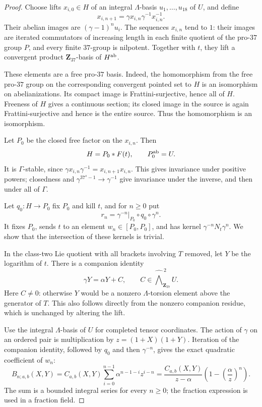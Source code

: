 \begin{proof}
Choose lifts \(x_{i,0}\in H\) of an integral \(\Lambda\)-basis
\(u_1,\ldots,u_{18}\) of \(U\), and define
\[
 x_{i,n+1}=\gamma x_{i,n}\gamma^{-1}x_{i,n}^{-1}.
\]
Their abelian images are \((\gamma-1)^nu_i\).
The sequences \(x_{i,n}\) tend to \(1\): their images are
iterated commutators of increasing length in each finite
quotient of the pro-\(37\) group \(P\), and every finite
\(37\)-group is nilpotent.
Together with \(t\), they lift a convergent product
\(\mathbf Z_{37}\)-basis of \(H^{\rm ab}\).

These elements are a free pro-\(37\) basis. Indeed, the
homomorphism from the free pro-\(37\) group on the corresponding
convergent pointed set to \(H\) is an isomorphism on
abelianizations. Its compact image is Frattini-surjective,
hence all of \(H\). Freeness of \(H\) gives a continuous
section; its closed image in the source is again
Frattini-surjective and hence is the entire source.
Thus the homomorphism is an isomorphism.

Let \(P_0\) be the closed free factor on the \(x_{i,n}\).
Then
\[
 H=P_0*F(t),\qquad P_0^{\rm ab}=U.
\]
It is \(\Gamma\)-stable, since
\(\gamma x_{i,n}\gamma^{-1}=x_{i,n+1}x_{i,n}\).
This gives invariance under positive powers; closedness and
\(\gamma^{37^s-1}\to\gamma^{-1}\) give invariance under the
inverse, and then under all of \(\Gamma\).

Let \(q_0:H\to P_0\) fix \(P_0\) and kill \(t\), and for
\(n\ge0\) put
\[
 r_n=\gamma^{-n}|_{P_0}\circ q_0\circ\gamma^n.
\]
It fixes \(P_0\), sends \(t\) to an element \(w_n\in[P_0,P_0]\),
and has kernel \(\gamma^{-n}N_t\gamma^n\).
We show that the intersection of these kernels is trivial.

In the class-two Lie quotient with all brackets involving
\(T\) removed, let \(Y\) be the logarithm of \(t\).
There is a companion identity
\[
 \gamma Y=\alpha Y+C,\qquad
 C\in\widehat{\bigwedge}^{\,2}_{\mathbf Z_{37}}U.
\]
Here \(C\ne0\): otherwise \(Y\) would be a nonzero
\(\Lambda\)-torsion element above the generator of \(T\).
This also follows directly from the nonzero companion
residue, which is unchanged by altering the lift.

Use the integral \(\Lambda\)-basis of \(U\) for completed
tensor coordinates. The action of \(\gamma\) on an ordered
pair is multiplication by \(z=(1+X)(1+Y)\).
Iteration of the companion identity, followed by \(q_0\)
and then \(\gamma^{-n}\), gives the exact quadratic
coefficient of \(w_n\):
\[
 B_{n;a,b}(X,Y)
 =C_{a,b}(X,Y)\sum_{i=0}^{n-1}\alpha^{n-1-i}z^{i-n}
 =\frac{C_{a,b}(X,Y)}{z-\alpha}
       \left(1-\left(\frac{\alpha}{z}\right)^n\right).
                                                        \tag{*}
\]
The sum is a bounded integral series for every \(n\ge0\);
the fraction expression is used in a fraction field.


\end{proof}
